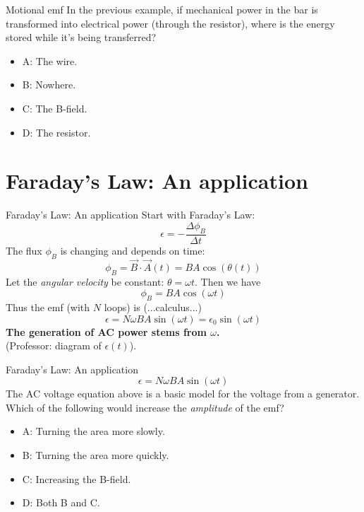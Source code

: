 \documentclass{beamer}
\begin{document}
\begin{frame}{Motional emf}
In the previous example, if mechanical power in the bar is transformed into electrical power (through the resistor), where is the energy stored while it's being transferred?
\begin{itemize}
\item A: The wire.
\item B: Nowhere.
\item C: The B-field.
\item D: The resistor.
\end{itemize}
\end{frame}

\section{Faraday's Law: An application}

\begin{frame}{Faraday's Law: An application}
Start with Faraday's Law:
\begin{equation}
\epsilon = - \frac{\Delta \phi_B}{\Delta t}
\end{equation}
The flux $\phi_B$ is changing and depends on time:
\begin{equation}
\phi_B = \vec{B} \cdot \vec{A}(t) = BA\cos(\theta(t))
\end{equation}
Let the \textit{angular velocity} be constant: $\theta = \omega t$.  Then we have
\begin{equation}
\phi_B  = BA\cos(\omega t)
\end{equation}
Thus the emf (with $N$ loops) is (...calculus...)
\begin{equation}
\epsilon = N\omega BA \sin(\omega t) = \epsilon_0 \sin(\omega t)
\end{equation}
\textbf{The generation of AC power stems from $\omega$.} \\ (Professor: diagram of $\epsilon(t)$).
\end{frame}

\begin{frame}{Faraday's Law: An application}
\begin{equation}
\epsilon = N\omega BA \sin(\omega t)
\end{equation}
The AC voltage equation above is a basic model for the voltage from a generator.  Which of the following would increase the \textit{amplitude} of the emf?
\begin{itemize}
\item A: Turning the area more slowly.
\item B: Turning the area more quickly.
\item C: Increasing the B-field.
\item D: Both B and C.
\end{itemize}
\end{frame}
\end{document}

